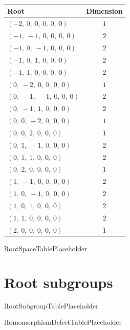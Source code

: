 \documentclass[11pt]{article}
\theoremstyle{definition}
\begin{document}
\begin{center}
\begin{tabular}{|l|c|}
\hline
Root & Dimension \\
\hline
$\left( -2, \  0, \  0, \  0, \  0, \  0\right)$ & $1$ \\
\hline
$\left( -1, \  -1, \  0, \  0, \  0, \  0\right)$ & $2$ \\
\hline
$\left( -1, \  0, \  -1, \  0, \  0, \  0\right)$ & $2$ \\
\hline
$\left( -1, \  0, \  1, \  0, \  0, \  0\right)$ & $2$ \\
\hline
$\left( -1, \  1, \  0, \  0, \  0, \  0\right)$ & $2$ \\
\hline
$\left( 0, \  -2, \  0, \  0, \  0, \  0\right)$ & $1$ \\
\hline
$\left( 0, \  -1, \  -1, \  0, \  0, \  0\right)$ & $2$ \\
\hline
$\left( 0, \  -1, \  1, \  0, \  0, \  0\right)$ & $2$ \\
\hline
$\left( 0, \  0, \  -2, \  0, \  0, \  0\right)$ & $1$ \\
\hline
$\left( 0, \  0, \  2, \  0, \  0, \  0\right)$ & $1$ \\
\hline
$\left( 0, \  1, \  -1, \  0, \  0, \  0\right)$ & $2$ \\
\hline
$\left( 0, \  1, \  1, \  0, \  0, \  0\right)$ & $2$ \\
\hline
$\left( 0, \  2, \  0, \  0, \  0, \  0\right)$ & $1$ \\
\hline
$\left( 1, \  -1, \  0, \  0, \  0, \  0\right)$ & $2$ \\
\hline
$\left( 1, \  0, \  -1, \  0, \  0, \  0\right)$ & $2$ \\
\hline
$\left( 1, \  0, \  1, \  0, \  0, \  0\right)$ & $2$ \\
\hline
$\left( 1, \  1, \  0, \  0, \  0, \  0\right)$ & $2$ \\
\hline
$\left( 2, \  0, \  0, \  0, \  0, \  0\right)$ & $1$ \\
\hline
\end{tabular}\end{center}

RootSpaceTablePlaceholder

\section{Root subgroups}

RootSubgroupTablePlaceholder

HomomorphismDefectTablePlaceholder
\end{document}
